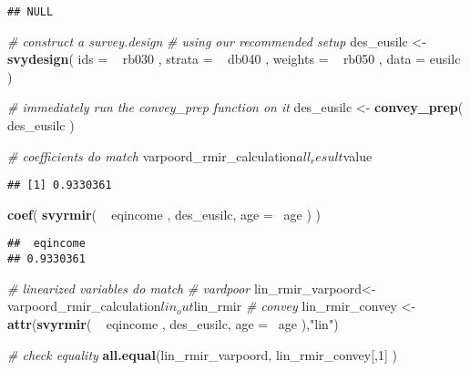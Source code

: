 \documentclass[]{book}
\newenvironment{Shaded}{\begin{snugshade}}{\end{snugshade}}
\newcommand{\KeywordTok}[1]{\textcolor[rgb]{0.13,0.29,0.53}{\textbf{{#1}}}}
\newcommand{\DataTypeTok}[1]{\textcolor[rgb]{0.13,0.29,0.53}{{#1}}}
\newcommand{\DecValTok}[1]{\textcolor[rgb]{0.00,0.00,0.81}{{#1}}}
\newcommand{\StringTok}[1]{\textcolor[rgb]{0.31,0.60,0.02}{{#1}}}
\newcommand{\CommentTok}[1]{\textcolor[rgb]{0.56,0.35,0.01}{\textit{{#1}}}}
\newcommand{\NormalTok}[1]{{#1}}
\begin{document}
\begin{verbatim}
## NULL
\end{verbatim}

\begin{Shaded}
\begin{Highlighting}[]
\CommentTok{# construct a survey.design}
\CommentTok{# using our recommended setup}
\NormalTok{des_eusilc <-}\StringTok{ }
\StringTok{    }\KeywordTok{svydesign}\NormalTok{( }
        \DataTypeTok{ids =} \NormalTok{~}\StringTok{ }\NormalTok{rb030 , }
        \DataTypeTok{strata =} \NormalTok{~}\StringTok{ }\NormalTok{db040 ,  }
        \DataTypeTok{weights =} \NormalTok{~}\StringTok{ }\NormalTok{rb050 , }
        \DataTypeTok{data =} \NormalTok{eusilc}
    \NormalTok{)}

\CommentTok{# immediately run the convey_prep function on it}
\NormalTok{des_eusilc <-}\StringTok{ }\KeywordTok{convey_prep}\NormalTok{( des_eusilc )}

\CommentTok{# coefficients do match}
\NormalTok{varpoord_rmir_calculation$all_result$value}
\end{Highlighting}
\end{Shaded}

\begin{verbatim}
## [1] 0.9330361
\end{verbatim}

\begin{Shaded}
\begin{Highlighting}[]
\KeywordTok{coef}\NormalTok{( }\KeywordTok{svyrmir}\NormalTok{( ~}\StringTok{ }\NormalTok{eqincome , des_eusilc, }\DataTypeTok{age =} \NormalTok{~age ) ) }
\end{Highlighting}
\end{Shaded}

\begin{verbatim}
##  eqincome 
## 0.9330361
\end{verbatim}

\begin{Shaded}
\begin{Highlighting}[]
\CommentTok{# linearized variables do match}
\CommentTok{# vardpoor}
\NormalTok{lin_rmir_varpoord<-}\StringTok{ }\NormalTok{varpoord_rmir_calculation$lin_out$lin_rmir}
\CommentTok{# convey }
\NormalTok{lin_rmir_convey <-}\StringTok{ }\KeywordTok{attr}\NormalTok{(}\KeywordTok{svyrmir}\NormalTok{( ~}\StringTok{ }\NormalTok{eqincome , des_eusilc, }\DataTypeTok{age =} \NormalTok{~age ),}\StringTok{"lin"}\NormalTok{)}

\CommentTok{# check equality}
\KeywordTok{all.equal}\NormalTok{(lin_rmir_varpoord, lin_rmir_convey[,}\DecValTok{1}\NormalTok{] )}
\end{Highlighting}
\end{Shaded}
\end{document}

